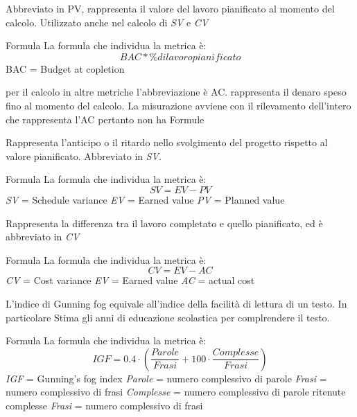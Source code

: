 Abbreviato in PV, rappresenta il valore del lavoro pianificato al momento del calcolo. Utilizzato anche nel calcolo di \textit{SV} e \textit{CV}
\par{Formula}
La formula che individua la metrica è:
\begin{displaymath}
  BAC * \% di lavoro pianif icato
\end{displaymath}
BAC = Budget at copletion


per il calcolo in altre metriche l'abbreviazione è AC.
rappresenta il denaro speso fino al momento del calcolo.
La misurazione avviene con il rilevamento dell'intero che rappresenta l'AC pertanto non ha Formule


Rappresenta l'anticipo o il ritardo nello svolgimento del progetto rispetto al valore pianificato. Abbreviato in \textit{SV}.
\par{Formula}
La formula che individua la metrica è:
\begin{displaymath}
  \textit{SV} = \textit{EV} - \textit{PV}
\end{displaymath}
\textit{SV} = Schedule variance
\textit{EV} = Earned value
\textit{PV} = Planned value


Rappresenta la differenza tra il lavoro completato e quello pianificato, ed è abbreviato in \textit{CV}
\par{Formula}
La formula che individua la metrica è:
\begin{displaymath}
  \textit{CV} = \textit{EV} - \textit{AC}
\end{displaymath}
\textit{CV} = Cost variance
\textit{EV} = Earned value
\textit{AC} = actual cost


L'indice di Gunning fog equivale all'indice della facilità di lettura di un testo. In particolare Stima gli anni di educazione scolastica per complrendere il testo.
\par{Formula}
La formula che individua la metrica è:
\begin{displaymath}
  \textit{IGF} = 0.4·(\frac{ \textit{Parole}}{\textit{Frasi}} + 100·  \frac{\textit{Complesse}}{ \textit{Frasi}})
\end{displaymath}
\textit{IGF} = Gunning's fog index
\textit{Parole} = numero complessivo di parole
\textit{Frasi} = numero complessivo di frasi
\textit{Complesse} = numero complessivo di parole ritenute complesse
\textit{Frasi} = numero complessivo di frasi


